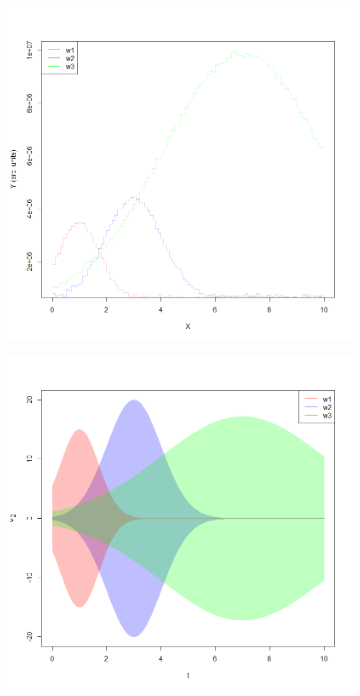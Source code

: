 \documentclass{article}
\begin{document}
 \begin{figure}[h]
	\centering
	\begin{subfigure}[t]{0.32\textwidth}
		\centering
		\includegraphics[width=\linewidth]{Proof_Concept_noiseless_list_xbox.png}
		\label{F3a}
	\end{subfigure}
	\hfill
	\begin{subfigure}[t]{0.32\textwidth}
		\centering
		\includegraphics[width=\linewidth]{Proof_Concept_noiseless.png}

\end{subfigure}
\end{figure}
\end{document}
